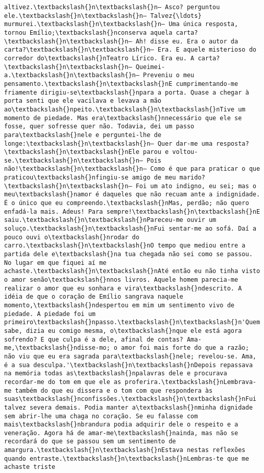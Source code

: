 \documentclass[11pt]{article}
\begin{document}
\begin{Verbatim}[commandchars=\\\{\}]
altivez.\textbackslash{}n\textbackslash{}n— Asco? perguntou ele.\textbackslash{}n\textbackslash{}n— Talvez{\ldots} murmurei.\textbackslash{}n\textbackslash{}n— Uma única resposta, tornou Emílio;\textbackslash{}nconserva aquela carta?\textbackslash{}n\textbackslash{}n— Ah! disse eu. Era o autor da carta?\textbackslash{}n\textbackslash{}n— Era. E aquele misterioso do corredor do\textbackslash{}nTeatro Lírico. Era eu. A carta?\textbackslash{}n\textbackslash{}n— Queimei-a.\textbackslash{}n\textbackslash{}n— Preveniu o meu pensamento.\textbackslash{}n\textbackslash{}nE cumprimentando-me friamente dirigiu-se\textbackslash{}npara a porta. Quase a chegar à porta senti que ele vacilava e levava a mão ao\textbackslash{}npeito.\textbackslash{}n\textbackslash{}nTive um momento de piedade. Mas era\textbackslash{}nnecessário que ele se fosse, quer sofresse quer não. Todavia, dei um passo para\textbackslash{}nele e perguntei-lhe de longe:\textbackslash{}n\textbackslash{}n— Quer dar-me uma resposta?\textbackslash{}n\textbackslash{}nEle parou e voltou-se.\textbackslash{}n\textbackslash{}n— Pois não!\textbackslash{}n\textbackslash{}n— Como é que para praticar o que praticou\textbackslash{}nfingiu-se amigo de meu marido?\textbackslash{}n\textbackslash{}n— Foi um ato indigno, eu sei; mas o meu\textbackslash{}namor é daqueles que não recuam ante a indignidade. É o único que eu compreendo.\textbackslash{}nMas, perdão; não quero enfadá-la mais. Adeus! Para sempre!\textbackslash{}n\textbackslash{}nE saiu.\textbackslash{}n\textbackslash{}nPareceu-me ouvir um soluço.\textbackslash{}n\textbackslash{}nFui sentar-me ao sofá. Daí a pouco ouvi o\textbackslash{}nrodar do carro.\textbackslash{}n\textbackslash{}nO tempo que mediou entre a partida dele e\textbackslash{}na tua chegada não sei como se passou. No lugar em que fiquei aí me achaste.\textbackslash{}n\textbackslash{}nAté então eu não tinha visto o amor senão\textbackslash{}nnos livros. Aquele homem parecia-me realizar o amor que eu sonhara e vira\textbackslash{}ndescrito. A idéia de que o coração de Emílio sangrava naquele momento,\textbackslash{}ndespertou em mim um sentimento vivo de piedade. A piedade foi um primeiro\textbackslash{}npasso.\textbackslash{}n\textbackslash{}n'Quem sabe, dizia eu comigo mesma, o\textbackslash{}nque ele está agora sofrendo? E que culpa é a dele, afinal de contas? Ama-me,\textbackslash{}ndisse-mo; o amor foi mais forte do que a razão; não viu que eu era sagrada para\textbackslash{}nele; revelou-se. Ama, é a sua desculpa.'\textbackslash{}n\textbackslash{}nDepois repassava na memória todas as\textbackslash{}npalavras dele e procurava recordar-me do tom em que ele as proferira.\textbackslash{}nLembrava-me também do que eu dissera e o tom com que respondera às suas\textbackslash{}nconfissões.\textbackslash{}n\textbackslash{}nFui talvez severa demais. Podia manter a\textbackslash{}nminha dignidade sem abrir-lhe uma chaga no coração. Se eu falasse com mais\textbackslash{}nbrandura podia adquirir dele o respeito e a veneração. Agora há de amar-me\textbackslash{}nainda, mas não se recordará do que se passou sem um sentimento de amargura.\textbackslash{}n\textbackslash{}nEstava nestas reflexões quando entraste.\textbackslash{}n\textbackslash{}nLembras-te que me achaste triste 
\end{Verbatim}
\end{document}
